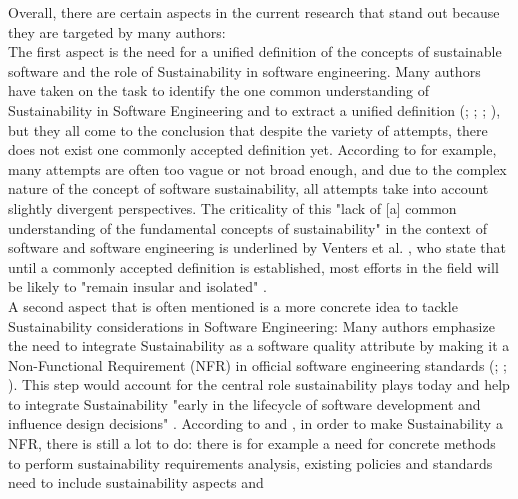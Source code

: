 \documentclass[oribibl]{llncs}
\begin{document}
Overall, there are certain aspects in the current research that stand out because they are targeted by many authors:\\
The first aspect is the need for a unified definition of the concepts of sustainable software %
and the role of Sustainability in software engineering. Many authors have taken on the task to identify the one common understanding of Sustainability in Software Engineering and to extract a unified definition (\cite{venters_software_2014}; %
 \cite{becker_sustainability_2015}%
; \cite{calero_green_2015}; \cite{penzenstadler_what_13}), but they all come to the conclusion that despite the variety of attempts, there does not exist one commonly accepted definition yet. According to \cite{venters_software_2014} for example, many attempts are often too vague or not broad enough, and due to the complex nature of the concept of software sustainability, all attempts take into account slightly divergent perspectives. %
The criticality %
of this "lack of [a] common understanding of the fundamental concepts of sustainability" \cite{becker_sustainability_2015} in the context of software and software engineering is underlined by Venters et al. \cite{venters_software_2014}, who state that until a commonly accepted definition is established, most efforts in the field will be likely to "remain insular and isolated" \cite{venters_software_2014}.\\ %
A second aspect that is often mentioned is a more concrete idea to tackle Sustainability considerations in Software Engineering: Many authors emphasize the need to integrate Sustainability as a software quality attribute by making it a Non-Functional Requirement (NFR) %
in official software engineering standards (\cite{penzenstadler_safety_2014}; \cite{amsel_toward_2011}; \cite{agarwal_sustainable_2012}). This step would account for the central role sustainability plays today \cite{penzenstadler_safety_2014} and help to integrate Sustainability "early in the lifecycle of software development and influence design decisions" \cite{raturi_developing_2014}. %
 According to \cite{penzenstadler_safety_2014} and \cite{venters_software_2014}, in order to make Sustainability a NFR, there is still a lot to do: there is for example a need for concrete methods to perform sustainability requirements analysis, existing policies and standards need to include sustainability aspects and %
\end{document}
